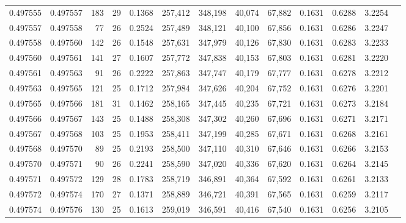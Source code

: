 \begin{tabular}{rrrrrrrrrrrrr}
0.497555 & 0.497557 & 183 &  29 &                                     0.1368 & 257,412 & 348,198 &  40,074 &  67,882 & 0.1631 & 0.6288 & 3.2254 \\
0.497557 & 0.497558 &  77 &  26 &                                     0.2524 & 257,489 & 348,121 &  40,100 &  67,856 & 0.1631 & 0.6286 & 3.2247 \\
0.497558 & 0.497560 & 142 &  26 &                                     0.1548 & 257,631 & 347,979 &  40,126 &  67,830 & 0.1631 & 0.6283 & 3.2233 \\
0.497560 & 0.497561 & 141 &  27 &                                     0.1607 & 257,772 & 347,838 &  40,153 &  67,803 & 0.1631 & 0.6281 & 3.2220 \\
0.497561 & 0.497563 &  91 &  26 &                                     0.2222 & 257,863 & 347,747 &  40,179 &  67,777 & 0.1631 & 0.6278 & 3.2212 \\
0.497563 & 0.497565 & 121 &  25 &                                     0.1712 & 257,984 & 347,626 &  40,204 &  67,752 & 0.1631 & 0.6276 & 3.2201 \\
0.497565 & 0.497566 & 181 &  31 &                                     0.1462 & 258,165 & 347,445 &  40,235 &  67,721 & 0.1631 & 0.6273 & 3.2184 \\
0.497566 & 0.497567 & 143 &  25 &                                     0.1488 & 258,308 & 347,302 &  40,260 &  67,696 & 0.1631 & 0.6271 & 3.2171 \\
0.497567 & 0.497568 & 103 &  25 &                                     0.1953 & 258,411 & 347,199 &  40,285 &  67,671 & 0.1631 & 0.6268 & 3.2161 \\
0.497568 & 0.497570 &  89 &  25 &                                     0.2193 & 258,500 & 347,110 &  40,310 &  67,646 & 0.1631 & 0.6266 & 3.2153 \\
0.497570 & 0.497571 &  90 &  26 &                                     0.2241 & 258,590 & 347,020 &  40,336 &  67,620 & 0.1631 & 0.6264 & 3.2145 \\
0.497571 & 0.497572 & 129 &  28 &                                     0.1783 & 258,719 & 346,891 &  40,364 &  67,592 & 0.1631 & 0.6261 & 3.2133 \\
0.497572 & 0.497574 & 170 &  27 &                                     0.1371 & 258,889 & 346,721 &  40,391 &  67,565 & 0.1631 & 0.6259 & 3.2117 \\
0.497574 & 0.497576 & 130 &  25 &                                     0.1613 & 259,019 & 346,591 &  40,416 &  67,540 & 0.1631 & 0.6256 & 3.2105 \\

\end{tabular}
